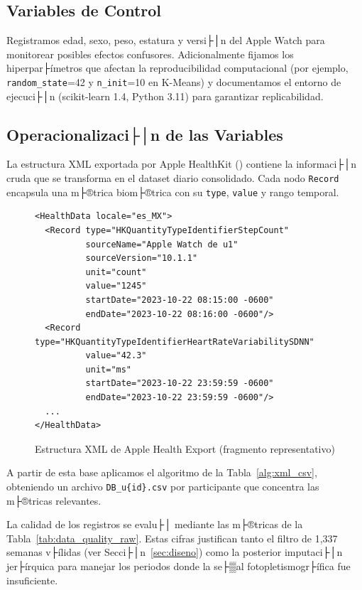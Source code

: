 \subsection{Variables de Control}
\label{subsec:variables_control}

Registramos edad, sexo, peso, estatura y versi├│n del Apple Watch para monitorear posibles efectos confusores. Adicionalmente fijamos los hiperpar├ímetros que afectan la reproducibilidad computacional (por ejemplo, \texttt{random\_state}=42 y \texttt{n\_init}=10 en K-Means) y documentamos el entorno de ejecuci├│n (scikit-learn 1.4, Python 3.11) para garantizar replicabilidad.

\subsection{Operacionalizaci├│n de las Variables}
\label{subsec:operacionalizacion_variables}

La estructura XML exportada por Apple HealthKit () contiene la informaci├│n cruda que se transforma en el dataset diario consolidado. Cada nodo \texttt{Record} encapsula una m├®trica biom├®trica con su \texttt{type}, \texttt{value} y rango temporal.

\begin{figure}[htbp]
    \centering
    \begin{minipage}{0.9\textwidth}
\begin{verbatim}
<HealthData locale="es_MX">
  <Record type="HKQuantityTypeIdentifierStepCount"
          sourceName="Apple Watch de u1"
          sourceVersion="10.1.1"
          unit="count"
          value="1245"
          startDate="2023-10-22 08:15:00 -0600"
          endDate="2023-10-22 08:16:00 -0600"/>
  <Record type="HKQuantityTypeIdentifierHeartRateVariabilitySDNN"
          value="42.3"
          unit="ms"
          startDate="2023-10-22 23:59:59 -0600"
          endDate="2023-10-22 23:59:59 -0600"/>
  ...
</HealthData>
\end{verbatim}
    \end{minipage}
    \caption{Estructura XML de Apple Health Export (fragmento representativo)}
    \label{lst:xml_structure}
\end{figure}

A partir de esta base aplicamos el algoritmo de la Tabla~\ref{alg:xml_csv}, obteniendo un archivo \texttt{DB\_u\{id\}.csv} por participante que concentra las m├®tricas relevantes.

La calidad de los registros se evalu├│ mediante las m├®tricas de la Tabla~\ref{tab:data_quality_raw}. Estas cifras justifican tanto el filtro de 1,337 semanas v├ílidas (ver Secci├│n~\ref{sec:diseno}) como la posterior imputaci├│n jer├írquica para manejar los periodos donde la se├▒al fotopletismogr├ífica fue insuficiente.

